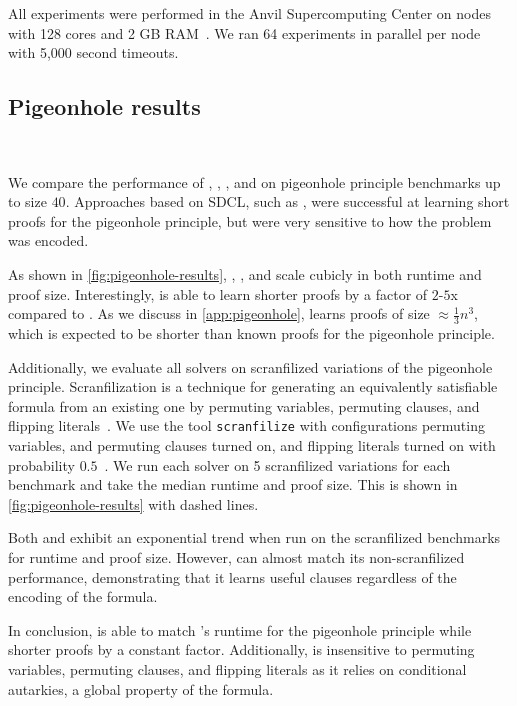 All experiments were performed in the Anvil Supercomputing Center on nodes with
128 cores and 2 GB RAM~\cite{anvil}. We ran 64 experiments in parallel per node
with 5,000 second timeouts.

\subsection{Pigeonhole results}~\label{subsec:eval-pigeonhole}

We compare the performance of \tool, \cadical, \sadical, and \prelearn on
pigeonhole principle benchmarks up to size $40$. Approaches based on SDCL, such
as \sadical, were successful at learning short proofs for the pigeonhole
principle, but were very sensitive to how the problem was encoded.

As shown in \autoref{fig:pigeonhole-results}, \prelearn, \sadical, and \tool scale cubicly
in both runtime and proof size. Interestingly, \tool is able to learn shorter
proofs by a factor of $2$-$5$x compared to \prelearn. As we discuss in
\autoref{app:pigeonhole}, \tool learns proofs of size $\approx \frac13 n^3$,
which is expected to be shorter than known \pr proofs for the pigeonhole principle.

Additionally, we evaluate all solvers on scranfilized variations of the
pigeonhole principle. Scranfilization is a technique for generating an
equivalently satisfiable formula from an existing one by permuting variables,
permuting clauses, and flipping literals~\cite{scranfilize}. We use the tool
\texttt{scranfilize} with configurations permuting variables,
and permuting clauses turned on, and flipping literals turned on with
probability $0.5$~\cite{scranfilize}. We run each solver on 5 scranfilized variations for
each benchmark and take the median runtime and proof size. This is shown in \autoref{fig:pigeonhole-results} with dashed lines.


Both \sadical and \cadical exhibit an exponential trend when run on the scranfilized benchmarks for runtime and proof size. However, \tool can almost match its non-scranfilized performance, demonstrating that it learns useful \pr clauses regardless of the encoding of the formula.

In conclusion, \tool is able to match \sadical's runtime for the pigeonhole principle while shorter proofs by a constant factor. Additionally, \tool is insensitive to permuting variables, permuting clauses, and flipping literals as it relies on conditional autarkies, a global property of the formula.


